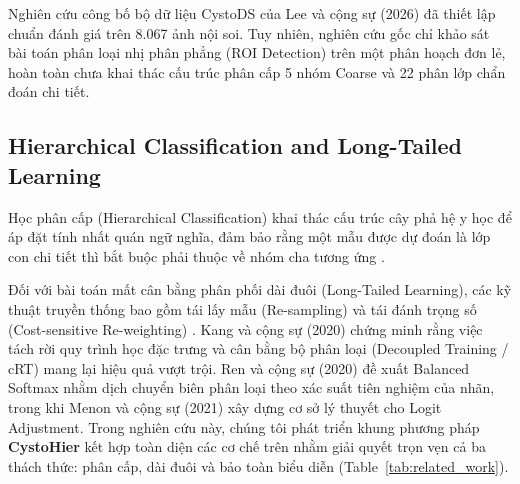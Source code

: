 \documentclass[runningheads]{llncs}
\begin{document}
Nghiên cứu công bố bộ dữ liệu CystoDS của Lee và cộng sự (2026) \cite{ref_lee2026cystods} đã thiết lập chuẩn đánh giá trên 8.067 ảnh nội soi. Tuy nhiên, nghiên cứu gốc chỉ khảo sát bài toán phân loại nhị phân phẳng (ROI Detection) trên một phân hoạch đơn lẻ, hoàn toàn chưa khai thác cấu trúc phân cấp 5 nhóm Coarse và 22 phân lớp chẩn đoán chi tiết.

\subsection{Hierarchical Classification and Long-Tailed Learning}
Học phân cấp (Hierarchical Classification) khai thác cấu trúc cây phả hệ y học để áp đặt tính nhất quán ngữ nghĩa, đảm bảo rằng một mẫu được dự đoán là lớp con chi tiết thì bắt buộc phải thuộc về nhóm cha tương ứng \cite{ref_lazo2023semisupervised}. 

Đối với bài toán mất cân bằng phân phối dài đuôi (Long-Tailed Learning), các kỹ thuật truyền thống bao gồm tái lấy mẫu (Re-sampling) và tái đánh trọng số (Cost-sensitive Re-weighting) \cite{ref_ren2020balanced}. Kang và cộng sự (2020) \cite{ref_kang2020decoupling} chứng minh rằng việc tách rời quy trình học đặc trưng và cân bằng bộ phân loại (Decoupled Training / cRT) mang lại hiệu quả vượt trội. Ren và cộng sự (2020) \cite{ref_ren2020balanced} đề xuất Balanced Softmax nhằm dịch chuyển biên phân loại theo xác suất tiên nghiệm của nhãn, trong khi Menon và cộng sự (2021) \cite{ref_menon2021logit} xây dựng cơ sở lý thuyết cho Logit Adjustment. Trong nghiên cứu này, chúng tôi phát triển khung phương pháp \textbf{CystoHier} kết hợp toàn diện các cơ chế trên nhằm giải quyết trọn vẹn cả ba thách thức: phân cấp, dài đuôi và bảo toàn biểu diễn (Table~\ref{tab:related_work}).
\end{document}
